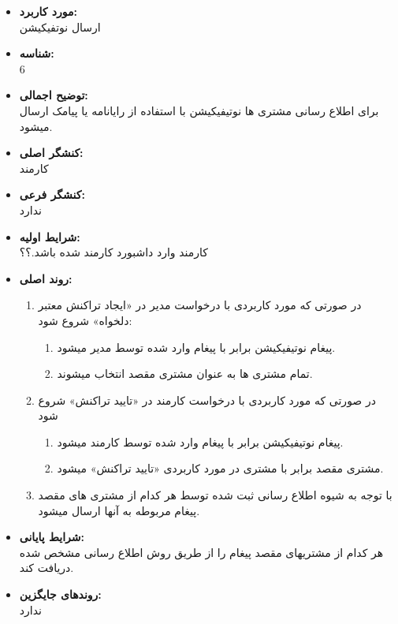 \documentclass{article}
\begin{document}
\begin{itemize}
\item \textbf{مورد کاربرد:}\\
ارسال نوتفیکیشن
\item \textbf{شناسه:}\\
6
\item \textbf{توضیح اجمالی:}\\
برای اطلاع رسانی مشتری ها نوتیفیکیشن با استفاده از رایانامه یا پیامک ارسال میشود.
\item \textbf{کنشگر اصلی:}\\
کارمند
\item \textbf{کنشگر فرعی:}\\
ندارد
\item \textbf{شرایط اولیه:}\\
کارمند وارد داشبورد کارمند شده باشد.؟؟
\item \textbf{روند اصلی:}\\
\begin{enumerate}
\item در صورتی که مورد کاربردی با درخواست مدیر در «ایجاد تراکنش معتبر دلخواه» شروع شود: 
\begin{enumerate}
\item پیغام نوتیفیکیشن برابر با پیغام وارد شده توسط مدیر میشود.
\item تمام مشتری ها به عنوان مشتری مقصد انتخاب میشوند.
\end{enumerate}
\item در صورتی که مورد کاربردی با درخواست کارمند در «تایید تراکنش» شروع شود
\begin{enumerate}
\item پیغام نوتیفیکیشن برابر با پیغام وارد شده توسط کارمند میشود.
\item مشتری مقصد برابر با مشتری در مورد کاربردی «تایید تراکنش» میشود.
\end{enumerate}
\item با توجه به شیوه اطلاع رسانی ثبت شده توسط هر کدام از مشتری های مقصد پیغام مربوطه به آنها ارسال میشود.
\end{enumerate}

\item \textbf{شرایط پایانی:}\\ 
هر کدام از مشتریهای مقصد پیغام را از طریق روش اطلاع رسانی مشخص شده دریافت کند.
\item \textbf{روندهای جایگزین:}\\
ندارد
\end{itemize}
\noindent\makebox[\linewidth]{\rule{\paperwidth}{0.4pt}}
\end{document}
